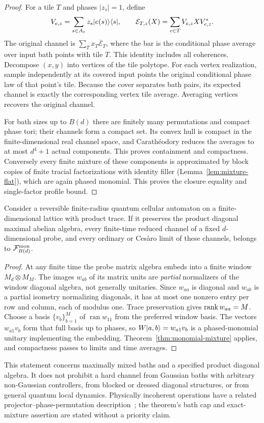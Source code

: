 \begin{proof}
For a tile $T$ and phases $|z_s|=1$, define
\[
 V_{e,z}=\sum_{s\in A_e}z_s\lvert e(s)\rangle\langle s\rvert,\qquad
 \mathcal E_{T,z}(X)=\sum_{e\in T}V_{e,z}XV_{e,z}^* .
\]
The original channel is $\sum_Tx_T\overline{\mathcal E}_T$, where the bar is the conditional phase average over input bath points with tile $T$.
This identity includes all coherences. Decompose $(x,y)$ into vertices of the tile polytope.
For each vertex realization, sample independently at its covered input points the original conditional phase law of that point's tile.
Because the cover separates bath pairs, its expected channel is exactly the corresponding vertex tile average.
Averaging vertices recovers the original channel.

For bath sizes up to $B(d)$ there are finitely many permutations and compact phase tori; their channels form a compact set.
Its convex hull is compact in the finite-dimensional real channel space, and Carath\'eodory reduces the averages to at most $d^4+1$
actual components. This proves containment and compactness.
Conversely every finite mixture of these components is approximated by block copies of finite tracial factorizations with identity filler
(Lemma~\ref{lem:mixture-flat}), which are again phased monomial. This proves the closure equality and single-factor profile bound.
\end{proof}

\begin{corollary}\label{cor:monomial-qca}
Consider a reversible finite-radius quantum cellular automaton on a finite-dimensional lattice with product trace.
If it preserves the product diagonal maximal abelian algebra, every finite-time reduced channel of a fixed $d$-dimensional probe,
and every ordinary or Ces\`aro limit of these channels, belongs to $\mathcal F_{B(d)}^{\rm mon}$.
\end{corollary}
\begin{proof}
At any finite time the probe matrix algebra embeds into a finite window $M_d\otimes M_M$.
The images $w_{ab}$ of its matrix units are \emph{partial} normalizers of the window diagonal algebra, not generally unitaries.
Since $w_{aa}$ is diagonal and $w_{ab}$ is a partial isometry normalizing diagonals, it has at most one nonzero entry per row and column,
each of modulus one. Trace preservation gives $\operatorname{rank} w_{aa}=M$.
Choose a basis $\{v_b\}_{b=1}^M$ of $\operatorname{ran}w_{11}$ from the preferred window basis.
The vectors $w_{a1}v_b$ form that full basis up to phases, so
$W\lvert a,b\rangle=w_{a1}v_b$ is a phased-monomial unitary implementing the embedding.
Theorem~\ref{thm:monomial-mixture} applies, and compactness passes to limits and time averages.
\end{proof}

This statement concerns maximally mixed baths and a specified product diagonal algebra. It does not prohibit a hard channel from Gaussian baths
with arbitrary non-Gaussian controllers, from blocked or dressed diagonal structures, or from general quantum local dynamics.
Physically incoherent operations have a related projector--phase-permutation description~\cite{ChitambarGour2016}; the theorem's bath
cap and exact-mixture assertion are stated without a priority claim.

